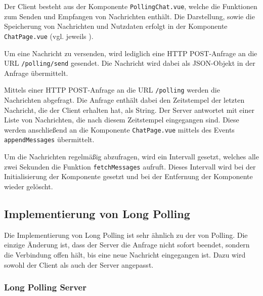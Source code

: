 \documentclass[sigplan, screen]{acmart}
\begin{document}
Der Client besteht aus der Komponente \texttt{PollingChat.vue}, welche die Funktionen zum Senden und Empfangen von Nachrichten enthält.
Die Darstellung, sowie die Speicherung von Nachrichten und Nutzdaten erfolgt in der Komponente \texttt{ChatPage.vue} (vgl. jeweils \cite[\texttt{code/client/src/components/}]{wagner_seminar2022_2022}).

Um eine Nachricht zu versenden, wird lediglich eine HTTP POST-Anfrage an die URL \texttt{/polling/send} gesendet.
Die Nachricht wird dabei als JSON-Objekt in der Anfrage übermittelt.



Mittels einer HTTP POST-Anfrage an die URL \texttt{/polling} werden die Nachrichten abgefragt.
Die Anfrage enthält dabei den Zeitstempel der letzten Nachricht, die der Client erhalten hat, als String.
Der Server antwortet mit einer Liste von Nachrichten, die nach diesem Zeitstempel eingegangen sind.
Diese werden anschließend an die Komponente \texttt{ChatPage.vue} mittels des Events \texttt{appendMessages} übermittelt.

Um die Nachrichten regelmäßig abzufragen, wird ein Intervall gesetzt, welches alle zwei Sekunden die Funktion \texttt{fetchMessages} aufruft.
Dieses Intervall wird bei der Initialisierung der Komponente gesetzt und bei der Entfernung der Komponente wieder gelöscht.



\subsection{Implementierung von Long Polling}

Die Implementierung von Long Polling ist sehr ähnlich zu der von Polling.
Die einzige Änderung ist, dass der Server die Anfrage nicht sofort beendet, sondern die Verbindung offen hält, bis eine neue Nachricht eingegangen ist.
Dazu wird sowohl der Client als auch der Server angepasst.

\subsubsection{Long Polling Server}
\end{document}
